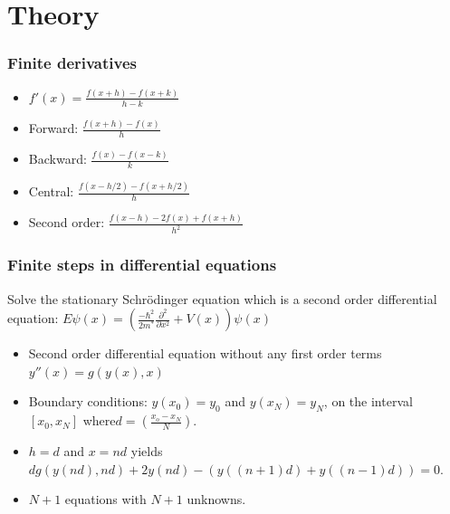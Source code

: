 \documentclass[•]{beamer}
\theoremstyle{remark}
\begin{document}
\section{Theory}

\begin{frame}\frametitle{Finite derivatives}
\begin{block}

\begin{itemize}
\item $f'(x) =\frac{f(x+h)-f(x+k)}{h-k}$
\pause
\item Forward: $\frac{f(x+h)-f(x)}{h}$
\pause
\item Backward: $\frac{f(x)-f(x-k)}{k}$
\pause
\item Central: $\frac{f(x-h/2)-f(x+h/2)}{h}$
\pause
\item Second order: $\frac{f(x-h)- 2f(x) +f(x+h)}{h^2}$
\end{itemize}
\end{block}
\end{frame}

\begin{frame}\frametitle{Finite steps in differential equations}
\begin{block}

Solve the stationary Schr\"odinger equation which is a second order differential equation:\pause
$ E \psi (x) = (\frac{-\hbar ^2}{2m^*} \frac{\partial^2}{\partial x^2} +V(x)) \psi (x)$
\pause
\begin{itemize}
\item Second order differential equation without any first order terms $y''(x) = g(y(x),x)$
\pause
\item Boundary conditions: $y(x_{0}) = y_{0}$ and $y(x_{N}) = y_{N}$, on the interval $[x_{0},x_{N}]$ where$ d = (\frac{x_{o}-x_{N}}{N})$.
\pause
\item $h = d$ and $x = nd$  yields $dg(y(nd),nd) + 2y(nd)-(y((n+1)d)+y((n-1)d)) = 0$.

\item  $N+1$ equations with $N+1$ unknowns.
\end{itemize}
\end{block}
\end{frame}
\end{document}
